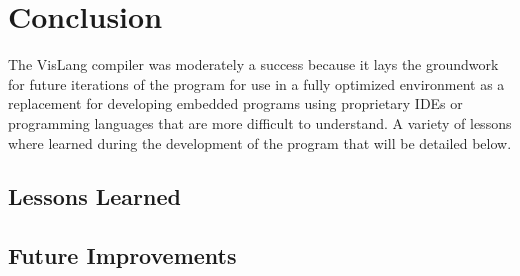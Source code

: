 \section{Conclusion}

The VisLang compiler was moderately a success because it lays the groundwork for future
iterations of the program for use in a fully optimized environment as a replacement for
developing embedded programs using proprietary IDEs or programming languages that are
more difficult to understand. A variety of lessons where learned during the development
of the program that will be detailed below.

\subsection{Lessons Learned}

\subsection{Future Improvements}
